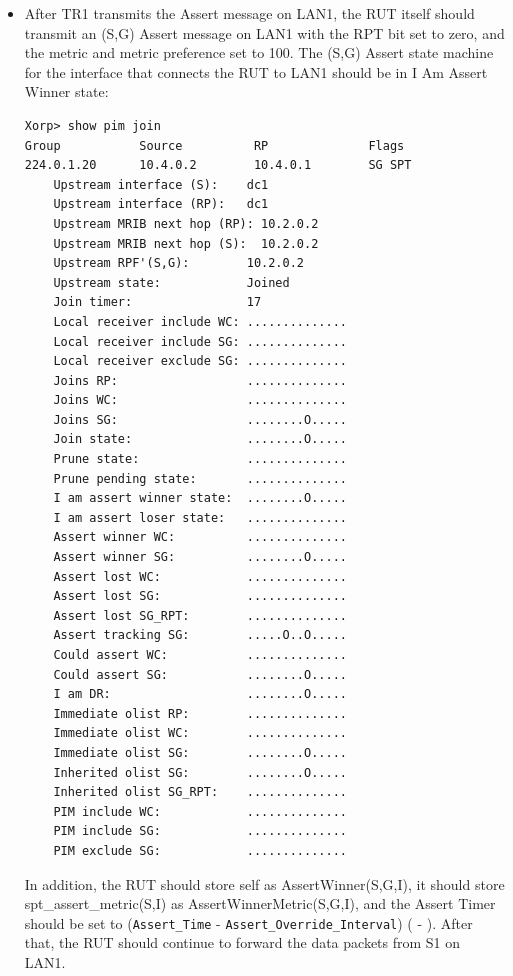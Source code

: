 \documentclass[11pt]{report}
\begin{document}
\begin{itemize}
  \item After TR1 transmits the Assert message on LAN1, the RUT itself should
  transmit an (S,G) Assert message on LAN1 with the RPT bit set to zero,
  and the metric and metric preference set to 100. The (S,G) Assert state
  machine for the interface that connects the RUT to LAN1 should be in I Am
  Assert Winner state:

\begin{verbatim}
Xorp> show pim join 
Group           Source          RP              Flags
224.0.1.20      10.4.0.2        10.4.0.1        SG SPT 
    Upstream interface (S):    dc1
    Upstream interface (RP):   dc1
    Upstream MRIB next hop (RP): 10.2.0.2
    Upstream MRIB next hop (S):  10.2.0.2
    Upstream RPF'(S,G):        10.2.0.2
    Upstream state:            Joined 
    Join timer:                17
    Local receiver include WC: ..............
    Local receiver include SG: ..............
    Local receiver exclude SG: ..............
    Joins RP:                  ..............
    Joins WC:                  ..............
    Joins SG:                  ........O.....
    Join state:                ........O.....
    Prune state:               ..............
    Prune pending state:       ..............
    I am assert winner state:  ........O.....
    I am assert loser state:   ..............
    Assert winner WC:          ..............
    Assert winner SG:          ........O.....
    Assert lost WC:            ..............
    Assert lost SG:            ..............
    Assert lost SG_RPT:        ..............
    Assert tracking SG:        .....O..O.....
    Could assert WC:           ..............
    Could assert SG:           ........O.....
    I am DR:                   ........O.....
    Immediate olist RP:        ..............
    Immediate olist WC:        ..............
    Immediate olist SG:        ........O.....
    Inherited olist SG:        ........O.....
    Inherited olist SG_RPT:    ..............
    PIM include WC:            ..............
    PIM include SG:            ..............
    PIM exclude SG:            ..............
\end{verbatim}

  In addition, the RUT should store self as AssertWinner(S,G,I), it should
  store spt\_assert\_metric(S,I) as AssertWinnerMetric(S,G,I), and the
  Assert Timer should be set to \newline
  (\verb=Assert_Time= - \verb=Assert_Override_Interval=)
  ({\PimsmAssertTime} - {\PimsmAssertOverrideInterval}).
  After that, the RUT should continue to forward the data packets from S1 on
  LAN1.

\end{itemize}
\end{document}
